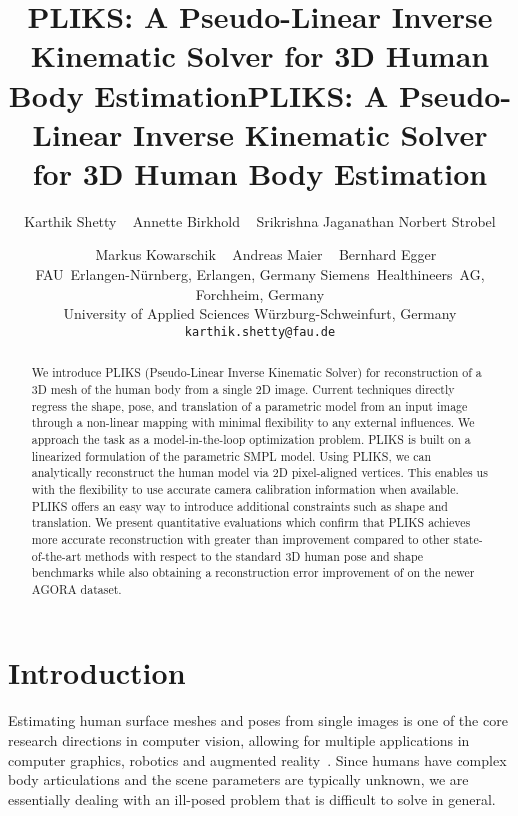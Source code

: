 \documentclass[10pt,twocolumn,letterpaper]{article}
\begin{document}
\title{PLIKS: A Pseudo-Linear Inverse Kinematic Solver for 3D Human Body Estimation}



\title{PLIKS: A Pseudo-Linear Inverse Kinematic Solver for 3D Human Body Estimation}

\author{{Karthik Shetty} ~ {Annette Birkhold}  ~ {Srikrishna Jaganathan}  {Norbert Strobel} \and ~  {Markus Kowarschik} ~  {Andreas Maier} ~ {Bernhard Egger} \\
\normalsize FAU~Erlangen-Nürnberg, Erlangen, Germany \quad
\normalsize Siemens~Healthineers~AG, Forchheim, Germany\\
\normalsize University of Applied Sciences W\"urzburg-Schweinfurt, Germany\\
{\tt\small karthik.shetty@fau.de}
}
\maketitle

\begin{abstract}
We introduce PLIKS (Pseudo-Linear Inverse Kinematic Solver) for reconstruction of a 3D mesh of the human body from a single 2D image. Current techniques directly regress the shape, pose, and translation of a parametric model from an input image through a non-linear mapping with minimal flexibility to any external influences. We approach the task as a model-in-the-loop optimization problem. PLIKS is built on a linearized formulation of the parametric SMPL model. Using PLIKS, we can analytically reconstruct the human model via 2D pixel-aligned vertices. This enables us with the flexibility to use accurate camera calibration information when available. PLIKS offers an easy way to introduce additional constraints such as shape and translation. We present quantitative evaluations which confirm that PLIKS achieves more accurate reconstruction with greater than  improvement compared to other state-of-the-art methods with respect to the standard 3D human pose and shape benchmarks while also obtaining a reconstruction error improvement of  on the newer AGORA dataset. 

\end{abstract}

\section{Introduction}

Estimating human surface meshes and poses from  single images is one of the core research directions in computer vision, allowing for multiple applications in computer graphics, robotics and augmented reality~\cite{LoPresti2016,Hogg1983ModelbasedVA}. Since humans have complex body articulations and the scene parameters are typically unknown, we are essentially dealing with an ill-posed problem that is difficult to solve in general.
\end{document}
